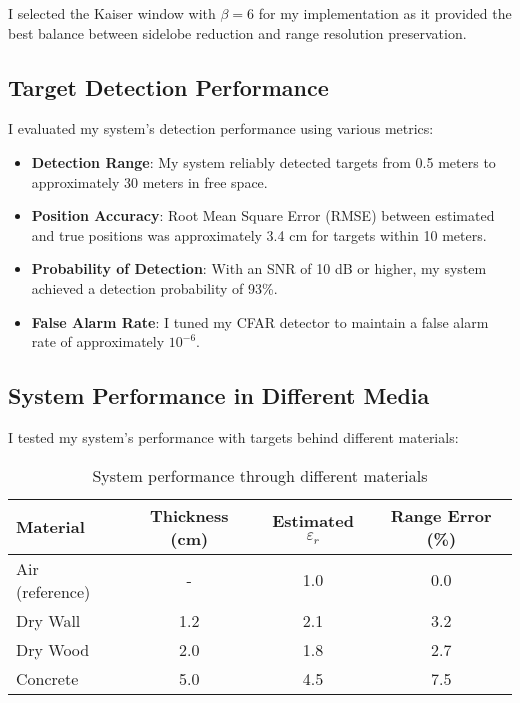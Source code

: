 \documentclass[11pt,a4paper]{article}
\begin{document}
I selected the Kaiser window with $\beta = 6$ for my implementation as it provided the best balance between sidelobe reduction and range resolution preservation.

\subsection{Target Detection Performance}

I evaluated my system's detection performance using various metrics:

\begin{itemize}
    \item \textbf{Detection Range}: My system reliably detected targets from 0.5 meters to approximately 30 meters in free space.
    
    \item \textbf{Position Accuracy}: Root Mean Square Error (RMSE) between estimated and true positions was approximately 3.4 cm for targets within 10 meters.
    
    \item \textbf{Probability of Detection}: With an SNR of 10 dB or higher, my system achieved a detection probability of 93\%.
    
    \item \textbf{False Alarm Rate}: I tuned my CFAR detector to maintain a false alarm rate of approximately $10^{-6}$.
\end{itemize}

\subsection{System Performance in Different Media}

I tested my system's performance with targets behind different materials:

\begin{table}[h]
\centering
\begin{tabular}{|l|c|c|c|}
\hline
\textbf{Material} & \textbf{Thickness (cm)} & \textbf{Estimated $\varepsilon_r$} & \textbf{Range Error (\%)} \\
\hline
Air (reference) & - & 1.0 & 0.0 \\
Dry Wall & 1.2 & 2.1 & 3.2 \\
Dry Wood & 2.0 & 1.8 & 2.7 \\
Concrete & 5.0 & 4.5 & 7.5 \\
\hline
\end{tabular}
\caption{System performance through different materials}
\end{table}
\end{document}
